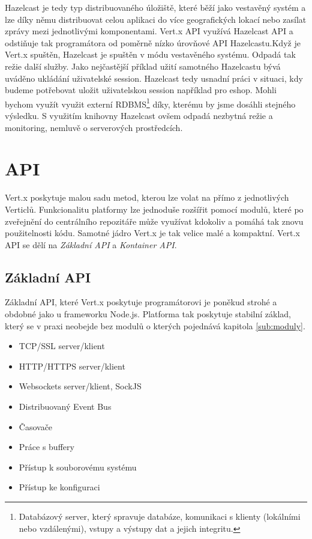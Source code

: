 Hazelcast je tedy typ distribuovaného úložiště, které běží jako vestavěný systém a lze díky němu distribuovat celou aplikaci do více geografických lokací nebo zasílat zprávy mezi jednotlivými komponentami. Vert.x API využívá Hazelcast API a odstiňuje tak programátora od poměrně nízko úrovňové API Hazelcastu.Když je Vert.x spuštěn, Hazelcast je spuštěn v módu vestavěného systému. Odpadá tak režie další služby. Jako nejčastější příklad užití samotného Hazelcastu bývá uváděno ukládání uživatelské session\cite{session}. Hazelcast tedy usnadní práci v situaci, kdy budeme potřebovat uložit uživatelskou session například pro eshop. Mohli bychom využít využit externí RDBMS\footnote{Databázový server, který spravuje databáze, komunikaci s klienty (lokálními nebo vzdálenými), vstupy a výstupy dat a jejich integritu.} díky, kterému by jsme dosáhli stejného výsledku. S využitím knihovny Hazelcast ovšem odpadá nezbytná režie a monitoring, nemluvě o serverových prostředcích.

\section{API}\label{sub:API}

Vert.x poskytuje malou sadu metod, kterou lze volat na přímo z jednotlivých Verticlů.
Funkcionalitu platformy lze jednoduše rozšířit pomocí modulů, které po zveřejnění do centrálního repozitáře může využívat kdokoliv a pomáhá tak znovu použitelnosti kódu. Samotné jádro Vert.x je tak velice malé a kompaktní. Vert.x API se dělí na \emph{Základní API} a \emph{Kontainer API}.

\subsection{Základní API}\label{sub:coreAPI}

Základní API, které Vert.x poskytuje programátorovi je poněkud strohé a obdobné jako u frameworku Node.js. Platforma tak poskytuje stabilní základ, který se v praxi neobejde bez modulů o kterých pojednává kapitola \ref{sub:moduly}.

\begin{itemize}
\item{TCP/SSL server/klient}
\item{HTTP/HTTPS server/klient}
\item{Websockets server/klient, SockJS}
\item{Distribuovaný Event Bus}
\item{Časovače}
\item{Práce s buffery}
\item{Přístup k souborovému systému}
\item{Přístup ke konfiguraci}
\end{itemize}

